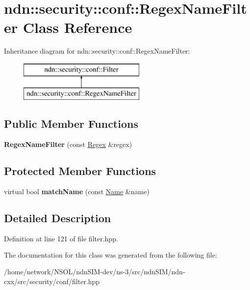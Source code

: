 \hypertarget{classndn_1_1security_1_1conf_1_1RegexNameFilter}{}\section{ndn\+:\+:security\+:\+:conf\+:\+:Regex\+Name\+Filter Class Reference}
\label{classndn_1_1security_1_1conf_1_1RegexNameFilter}
Inheritance diagram for ndn\+:\+:security\+:\+:conf\+:\+:Regex\+Name\+Filter\+:\begin{figure}[H]
\begin{center}
\leavevmode
\includegraphics[height=2.000000cm]{classndn_1_1security_1_1conf_1_1RegexNameFilter}
\end{center}
\end{figure}
\subsection*{Public Member Functions}
\begin{DoxyCompactItemize}
\item 
{\bfseries Regex\+Name\+Filter} (const \hyperlink{classndn_1_1RegexTopMatcher}{Regex} \&regex)\hypertarget{classndn_1_1security_1_1conf_1_1RegexNameFilter_a0a145a3dcdf7fa3afe4874a87a2c203a}{}\label{classndn_1_1security_1_1conf_1_1RegexNameFilter_a0a145a3dcdf7fa3afe4874a87a2c203a}

\end{DoxyCompactItemize}
\subsection*{Protected Member Functions}
\begin{DoxyCompactItemize}
\item 
virtual bool {\bfseries match\+Name} (const \hyperlink{classndn_1_1Name}{Name} \&name)\hypertarget{classndn_1_1security_1_1conf_1_1RegexNameFilter_adee3af5989b7f0e0ec8a8a4b10754383}{}\label{classndn_1_1security_1_1conf_1_1RegexNameFilter_adee3af5989b7f0e0ec8a8a4b10754383}

\end{DoxyCompactItemize}


\subsection{Detailed Description}


Definition at line 121 of file filter.\+hpp.



The documentation for this class was generated from the following file\+:\begin{DoxyCompactItemize}
\item 
/home/network/\+N\+S\+O\+L/ndn\+S\+I\+M-\/dev/ns-\/3/src/ndn\+S\+I\+M/ndn-\/cxx/src/security/conf/filter.\+hpp\end{DoxyCompactItemize}

